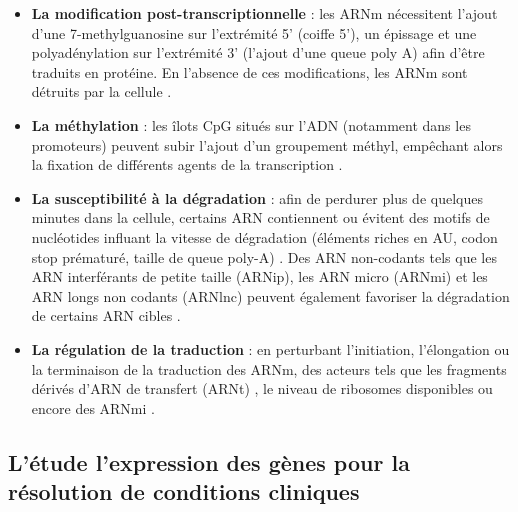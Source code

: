 \begin{itemize}
    \item \textbf{La modification post-transcriptionnelle} : les ARNm nécessitent l'ajout d'une 7-methylguanosine sur l'extrémité 5' (coiffe 5'), un épissage et une polyadénylation sur l'extrémité 3' (l'ajout d'une queue poly A) afin d'être traduits en protéine. En l'absence de ces modifications, les ARNm sont détruits par la cellule \cite{Mercer2010Nov}.
    \item \textbf{La méthylation} : les îlots CpG situés sur l'ADN (notamment dans les promoteurs) peuvent subir l'ajout d'un groupement méthyl, empêchant alors la fixation de différents agents de la transcription \cite{Gutierrez-Arcelus2013Jun}.
    \item \textbf{La susceptibilité à la dégradation} : afin de perdurer plus de quelques minutes dans la cellule, certains ARN contiennent ou évitent des motifs de nucléotides influant la vitesse de dégradation (éléments riches en AU, codon stop prématuré, taille de queue poly-A) \cite{Yu2001}. Des ARN non-codants tels que les ARN interférants de petite taille (ARNip), les ARN micro (ARNmi) et les ARN longs non codants (ARNlnc) peuvent également favoriser la dégradation de certains ARN cibles \cite{Patil2014Jan}.
    \item \textbf{La régulation de la traduction} : en perturbant l'initiation, l'élongation ou la terminaison de la traduction des ARNm, des acteurs tels que les fragments dérivés d'ARN de transfert (ARNt) \cite{Krishna2021Mar}, le niveau de ribosomes disponibles \cite{Khajuria2018Mar} ou encore des ARNmi \cite{Meijer2013Apr}.
\end{itemize}







\subsection{L'étude l'expression des gènes pour la résolution de conditions cliniques}



